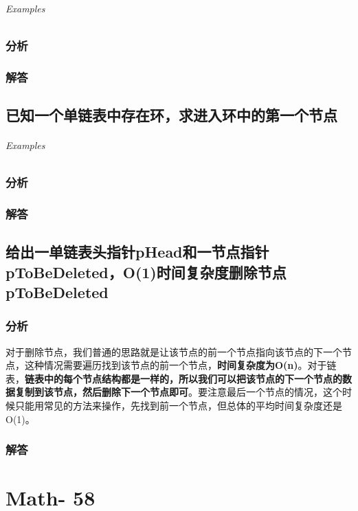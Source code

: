 \documentclass[UTF8,a4paper,12pt]{ctexbook}
\begin{document}
	\subparagraph{Examples}
	
	\subsection{分析}
	
	\subsection{解答}
	
	
\section{已知一个单链表中存在环，求进入环中的第一个节点}
	
	\subparagraph{Examples}
	
	\subsection{分析}
	
	\subsection{解答}
	

\section{给出一单链表头指针pHead和一节点指针pToBeDeleted，O(1)时间复杂度删除节点pToBeDeleted}
	\subsection{分析}
		对于删除节点，我们普通的思路就是让该节点的前一个节点指向该节点的下一个节点，这种情况需要遍历找到该节点的前一个节点，\textbf{时间复杂度为O(n)}。对于链表，\textbf{链表中的每个节点结构都是一样的，所以我们可以把该节点的下一个节点的数据复制到该节点，然后删除下一个节点即可}。要注意最后一个节点的情况，这个时候只能用常见的方法来操作，先找到前一个节点，但总体的平均时间复杂度还是O(1)。
	\subsection{解答}

\chapter{Math- 58}
\section{}
	
\end{document}
